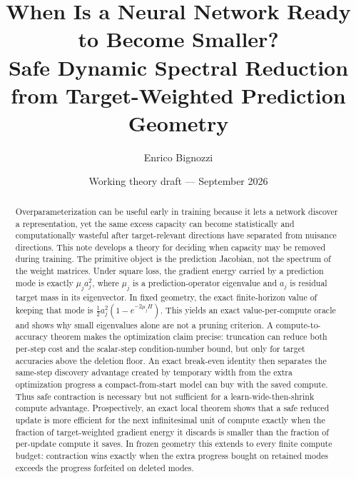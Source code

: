 \documentclass[11pt]{article}
\title{When Is a Neural Network Ready to Become Smaller?\\
Safe Dynamic Spectral Reduction from Target-Weighted Prediction Geometry}
\author{Enrico Bignozzi}
\date{Working theory draft --- September 2026}
\theoremstyle{definition}
\begin{document}
\maketitle

\begin{abstract}
Overparameterization can be useful early in training because it lets a network discover a representation, yet the same excess capacity can become statistically and computationally wasteful after target-relevant directions have separated from nuisance directions. This note develops a theory for deciding when capacity may be removed during training. The primitive object is the prediction Jacobian, not the spectrum of the weight matrices. Under square loss, the gradient energy carried by a prediction mode is exactly $\mu_j a_j^2$, where $\mu_j$ is a prediction-operator eigenvalue and $a_j$ is residual target mass in its eigenvector. In fixed geometry, the exact finite-horizon value of keeping that mode is $\frac12 a_j^2(1-e^{-2\mu_jH})$. This yields an exact value-per-compute oracle and shows why small eigenvalues alone are not a pruning criterion. A compute-to-accuracy theorem makes the optimization claim precise: truncation can reduce both per-step cost and the scalar-step condition-number bound, but only for target accuracies above the deletion floor. An exact break-even identity then separates the same-step discovery advantage created by temporary width from the extra optimization progress a compact-from-start model can buy with the saved compute. Thus safe contraction is necessary but not sufficient for a learn-wide-then-shrink compute advantage. Prospectively, an exact local theorem shows that a safe reduced update is more efficient for the next infinitesimal unit of compute exactly when the fraction of target-weighted gradient energy it discards is smaller than the fraction of per-update compute it saves. In frozen geometry this extends to every finite compute budget: contraction wins exactly when the extra progress bought on retained modes exceeds the progress forfeited on deleted modes.


\end{abstract}
\end{document}
